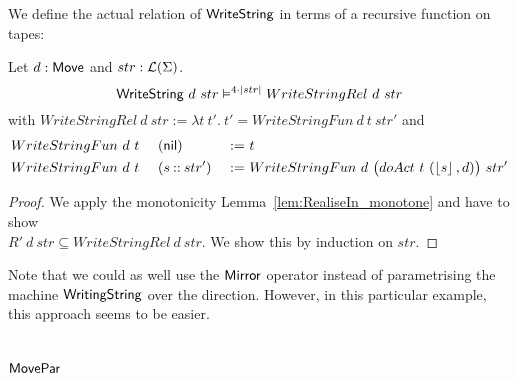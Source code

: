 We define the actual relation of $\textsf{WriteString}$ in terms of a recursive function on tapes:
\begin{lemma}
  \label{lem:WriteString_Sem}
  Let $d:\textsf{Move}$ and $str:\mathcal{L}(\Sigma)$.
  \[ \textsf{WriteString}~d~str \vDash^{4\cdot\left| str \right|} WriteStringRel~d~str \]
  with
  $WriteStringRel~d~str := \lambda t~t'.~t' = WriteStringFun~d~t~str'$ and
  \begin{alignat*}{3}
    &WriteStringFun~d~t~&&(\textsf{nil}        ) &~:=~& t \\
    &WriteStringFun~d~t~&&(s \mathbin{::} str') &~:=~& WriteStringFun~d~\bigl(doAct~t~(\left\lfloor {s} \right\rfloor, d)\bigr)~str'
  \end{alignat*}
\end{lemma}
\begin{proof}
  We apply the monotonicity Lemma~\ref{lem:RealiseIn_monotone} and have to show\\
  $R'~d~str \subseteq WriteStringRel~d~str$.  We show this by induction on $str$.
\end{proof}

Note that we could as well use the $\textsf{Mirror}$ operator instead of parametrising the machine $\textsf{WritingString}$ over the direction.  However, in
this particular example, this approach seems to be easier.

\section{$\textsf{MovePar}$}
\label{sec:MovePar}

